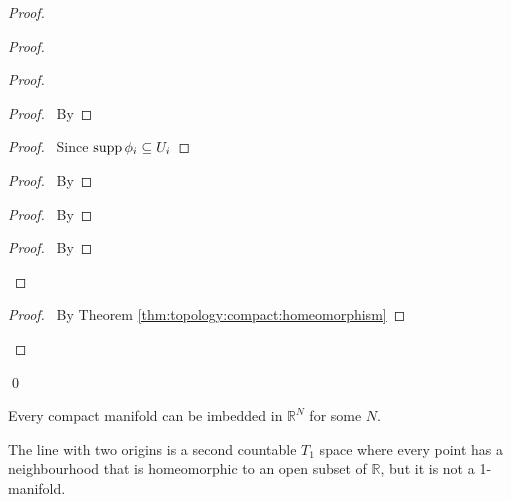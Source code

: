 \begin{proof}
\begin{proof}
\begin{proof}
   \begin{proof}
     \pf\ By 
   \end{proof}
   \begin{proof}
     \pf\ Since $\operatorname{supp} \phi_i \subseteq U_i$
   \end{proof}
   \begin{proof}
     \pf\ By 
   \end{proof}
   \begin{proof}
     \pf\ By 
   \end{proof}
   \begin{proof}
     \pf\ By 
   \end{proof}
 \end{proof}
 \qedstep
 \begin{proof}
   \pf\ By Theorem \ref{thm:topology:compact:homeomorphism}
 \end{proof}
\end{proof}
\qed
\end{proof}

  \begin{cor}
  Every compact manifold can be imbedded in $\mathbb{R}^N$ for some $N$.
\end{cor}

\begin{prop}
 The line with two origins is a second countable $T_1$ space where every point
 has a neighbourhood that is homeomorphic to an open subset of $\mathbb{R}$,
but it is not a 1-manifold.
\end{prop}
